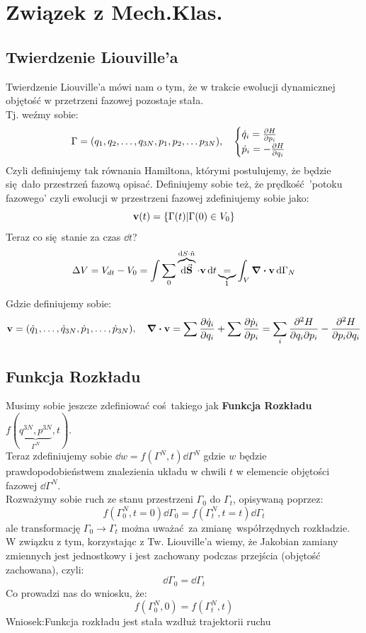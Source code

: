 \documentclass[12pt,a4paper]{report}
\renewcommand{\emph}{\textbf}
\newcommand{\wniosek}{{\color{orange} Wniosek:}}
\newenvironment{lecture}[1]{\par\medskip
   \noindent\chapter{#1} \rmfamily}{\medskip}
\begin{document}
\begin{lecture}{Związek z Mech.Klas.}
\section{Twierdzenie Liouville'a}
Twierdzenie Liouville'a mówi nam o tym, że w trakcie ewolucji dynamicznej objętość w przetrzeni fazowej pozostaje stała.\\
Tj. weźmy sobie:
\begin{align*}
    \Gamma = (q_1, q_2, \dots , q_{3N}, p_1, p_2,\dots p_{3N})\qc \begin{cases}
        \dot{q}_i = \pdv{H}{p_i}\\
        \dot{p}_i = - \pdv{H}{q_i}
    \end{cases}
\end{align*}
    Czyli definiujemy tak równania Hamiltona, którymi postulujemy, że będzie się dało przestrzeń fazową opisać. Definiujemy sobie też, że prędkość 'potoku fazowego' czyli ewolucji w przestrzeni fazowej zdefiniujemy sobie jako:
    \[
        \vb{v}(t) = \qty{\Gamma(t) | \Gamma(0) \in V_0}
    \]
    Teraz co się stanie za czas $\dd{t}$?
    \[
        \Delta V = V_{dt} - V_0 = \int{\sum_0} \overbrace{\dd{\va{S}}}^{\dd{S}\cdot\hat{n}} \cdot \vb{v} \dd{t} \underbrace{=}_{\footnotemark} \int_V \div \vb{v} \dd{\Gamma_N}
    \]
    Gdzie definiujemy sobie:
    \[
    \vb{v} = \qty(\dot{q}_1, \dots, \dot{q}_{3N}, \dot{p}_1, \dots, \dot{p}_{3N})\qc \div \vb{v} = \sum \pdv{\dot{q}_i}{q_i} + \sum \pdv{\dot{p}_i}{p_i} = \sum_i \pdv{H}{q_i}{p_i} - \pdv{H}{p_i}{q_i}
    \]
    \section{Funkcja Rozkładu}
    Musimy sobie jeszcze zdefiniować coś takiego jak \emph{Funkcja Rozkładu} $f(\underbrace{q^{3N}, p^{3N}}_{\Gamma^N}, t)$.\\
    Teraz zdefiniujemy sobie $\dd{w} = f(\Gamma^N, t) \dd{\Gamma^N}$ gdzie $w$ będzie prawdopodobieństwem znalezienia układu w chwili $t$ w elemencie objętości fazowej $\dd{\Gamma^N}$.\\
    Rozważymy sobie ruch ze stanu przestrzeni $\Gamma_0$ do $\Gamma_t$, opisywaną poprzez:
    \[
            f(\Gamma^N_0, t=0) \dd{\Gamma_0} = f(\Gamma^N_t, t=t) \dd{\Gamma_t}
    \]
    ale transformację $\Gamma_0 \to \Gamma_t$ można uważać za zmianę współrzędnych rozkładzie.
    W związku z tym, korzystając z Tw. Liouville'a wiemy, że Jakobian zamiany zmiennych jest jednostkowy i jest zachowany podczas przejścia (objętość zachowana), czyli:
    \begin{equation}
        \dd{\Gamma_0} = \dd{\Gamma_t}
        \label{eq:lec_15:liouville}
    \end{equation}
    Co prowadzi nas do wniosku, że:
    \[
        f(\Gamma_0^N, 0) = f(\Gamma_t^N, t)
    \]
    \wniosek  Funkcja rozkładu jest stała wzdłuż trajektorii ruchu

\end{lecture}
\end{document}
